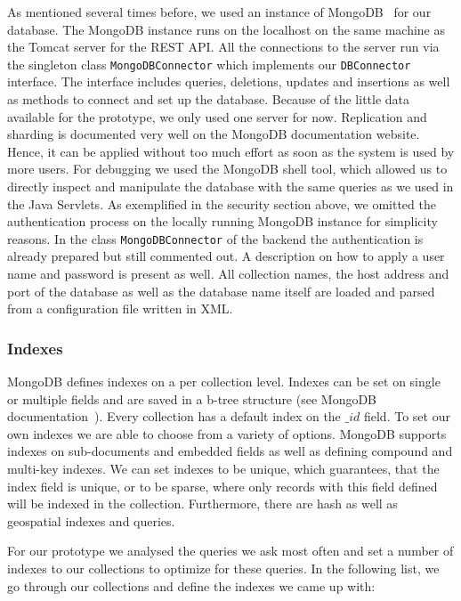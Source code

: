 As mentioned several times before, we used an instance of MongoDB~\cite{MongoDB} for our database. The MongoDB instance runs on the localhost on the same machine as the Tomcat server for the REST API. All the connections to the server run via the singleton class \verb+MongoDBConnector+ which implements our \verb+DBConnector+ interface. The interface includes queries, deletions, updates and insertions as well as methods to connect and set up the database. Because of the little data available for the prototype, we only used one server for now. Replication and sharding is documented very well on the MongoDB documentation website. Hence, it can be applied without too much effort as soon as the system is used by more users. For debugging we used the MongoDB shell tool, which allowed us to directly inspect and manipulate the database with the same queries as we used in the Java Servlets. As exemplified in the security section above, we omitted the authentication process on the locally running MongoDB instance for simplicity reasons. In the class \verb+MongoDBConnector+ of the backend the authentication is already prepared but still commented out. A description on how to apply a user name and password is present as well. All collection names, the host address and port of the database as well as the database name itself are loaded and parsed from a configuration file written in XML. 


\subsubsection{Indexes}
MongoDB defines indexes on a per collection level. Indexes can be set on single or multiple fields and are saved in a b-tree structure (see MongoDB documentation~\cite{MongoDBDoc}). Every collection has a default index on the $\_id$ field. To set our own indexes we are able to choose from a variety of options. MongoDB supports indexes on sub-documents and embedded fields as well as defining compound and multi-key indexes. We can set indexes to be unique, which guarantees, that the index field is unique, or to be sparse, where only records with this field defined will be indexed in the collection. Furthermore, there are hash as well as geospatial indexes and queries.

For our prototype we analysed the queries we ask most often and set a number of indexes to our collections to optimize for these queries. In the following list, we go through our collections and define the indexes we came up with:

